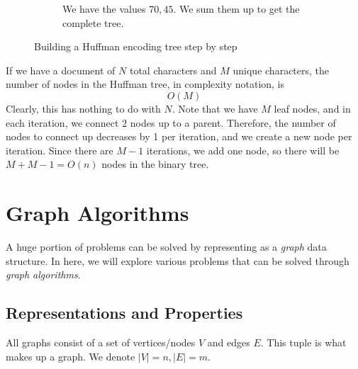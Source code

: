 \documentclass{article}
\begin{document}
\begin{example}
\begin{figure}[H]
\begin{subfigure}[b]{0.48\textwidth}
          \caption{We have the values $70, 45$. We sum them up to get the complete tree.}
          \label{fig:step4}
        \end{subfigure}
        \caption{Building a Huffman encoding tree step by step}
        \label{fig:huffman-construction}
      \end{figure}
    \end{example}

    \begin{theorem}
      If we have a document of $N$ total characters and $M$ unique characters, the number of nodes in the Huffman tree, in complexity notation, is 
      \begin{equation}
        O(M)
      \end{equation}
      Clearly, this has nothing to do with $N$. Note that we have $M$ leaf nodes, and in each iteration, we connect 2 nodes up to a parent. Therefore, the number of nodes to connect up decreases by 1 per iteration, and we create a new node per iteration. Since there are $M - 1$ iterations, we add one node, so there will be $M + M - 1 = O(n)$ nodes in the binary tree. 
    \end{theorem}

\section{Graph Algorithms}

    A huge portion of problems can be solved by representing as a \textit{graph} data structure. In here, we will explore various problems that can be solved through \textit{graph algorithms}. 

  \subsection{Representations and Properties}

    All graphs consist of a set of vertices/nodes $V$ and edges $E$. This tuple is what makes up a graph. We denote $|V| = n, |E| = m$. 
\end{document}

